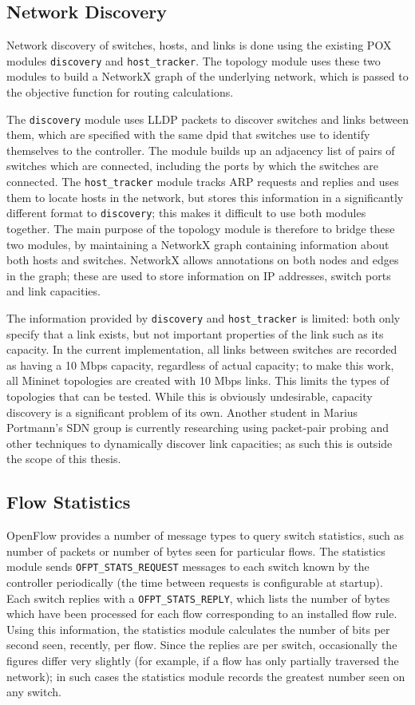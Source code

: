 \subsection{Network Discovery}
Network discovery of switches, hosts, and links is done using the existing POX modules \texttt{discovery} and \texttt{host\_tracker}. The topology module uses these two modules to build a NetworkX graph of the underlying network, which is passed to the objective function for routing calculations.

The \texttt{discovery} module uses LLDP packets to discover switches and links between them, which are specified with the same dpid that switches use to identify themselves to the controller. The module builds up an adjacency list of pairs of switches which are connected, including the ports by which the switches are connected. The \texttt{host\_tracker} module tracks ARP requests and replies and uses them to locate hosts in the network, but stores this information in a significantly different format to \texttt{discovery}; this makes it difficult to use both modules together. The main purpose of the topology module is therefore to bridge these two modules, by maintaining a NetworkX graph containing information about both hosts and switches. NetworkX allows annotations on both nodes and edges in the graph; these are used to store information on IP addresses, switch ports and link capacities.

The information provided by \texttt{discovery} and \texttt{host\_tracker} is limited: both only specify that a link exists, but not important properties of the link such as its capacity. In the current implementation, all links between switches are recorded as having a 10 Mbps capacity, regardless of actual capacity; to make this work, all Mininet topologies are created with 10 Mbps links. This limits the types of topologies that can be tested. While this is obviously undesirable, capacity discovery is a significant problem of its own. Another student in Marius Portmann's SDN group is currently researching using packet-pair probing and other techniques to dynamically discover link capacities; as such this is outside the scope of this thesis. 

\subsection{Flow Statistics}
OpenFlow provides a number of message types to query switch statistics, such as number of packets or number of bytes seen for particular flows. The statistics module sends \texttt{OFPT\_STATS\_REQUEST} messages to each switch known by the controller periodically (the time between requests is configurable at startup). Each switch replies with a \texttt{OFPT\_STATS\_REPLY}, which lists the number of bytes which have been processed for each flow corresponding to an installed flow rule. Using this information, the statistics module calculates the number of bits per second seen, recently, per flow. Since the replies are per switch, occasionally the figures differ very slightly (for example, if a flow has only partially traversed the network); in such cases the statistics module records the greatest number seen on any switch.


